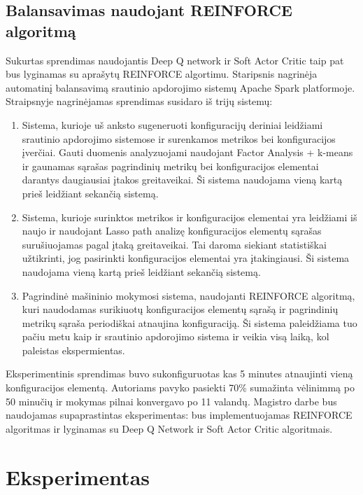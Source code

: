 \documentclass{VUMIFPSbakalaurinis}
\begin{document}
\subsection{Balansavimas naudojant REINFORCE algoritmą}
Sukurtas sprendimas naudojantis Deep Q network ir Soft Actor Critic taip pat bus lyginamas su \cite{vaquero2018autotuning} aprašytų REINFORCE algortimu. Staripsnis nagrinėja automatinį balansavimą srautinio apdorojimo sistemų Apache Spark platformoje. Straipsnyje nagrinėjamas sprendimas susidaro iš trijų sistemų:
\begin{enumerate}
    \item Sistema, kurioje uš anksto sugeneruoti konfiguracijų deriniai leidžiami srautinio apdorojimo sistemose ir surenkamos metrikos bei konfiguracijos įverčiai. Gauti duomenis analyzuojami naudojant Factor Analysis + k-means ir gaunamas sąrašas pagrindinių metrikų bei konfiguracijos elementai darantys daugiausiai įtakos greitaveikai. Ši sistema naudojama vieną kartą prieš leidžiant sekančią sistemą. 
    \item Sistema, kurioje surinktos metrikos ir konfiguracijos elementai yra leidžiami iš naujo ir naudojant Lasso path analizę konfiguracijos elementų sąrašas surušiuojamas pagal įtaką greitaveikai. Tai daroma siekiant statistiškai užtikrinti, jog pasirinkti konfiguracijos elementai yra įtakingiausi. Ši sistema naudojama vieną kartą prieš leidžiant sekančią sistemą.
    \item Pagrindinė mašininio mokymosi sistema, naudojanti REINFORCE algoritmą, kuri naudodamas surikiuotų konfiguracijos elementų sąrašą ir pagrindinių metrikų sąraša periodiškai atnaujina konfiguraciją. Ši sistema paleidžiama tuo pačiu metu kaip ir srautinio apdorojimo sistema ir veikia visą laiką, kol paleistas ekspermientas.
\end{enumerate}  
Eksperimentinis sprendimas buvo sukonfiguruotas kas 5 minutes atnaujinti vieną konfiguracijos elementą. Autoriams pavyko pasiekti 70\% sumažinta vėlinimmą po 50 minučių ir mokymas pilnai konvergavo po 11 valandų. Magistro darbe bus naudojamas supaprastintas eksperimentas: bus implementuojamas REINFORCE algoritmas ir lyginamas su Deep Q Network ir Soft Actor Critic algoritmais.

\section{Eksperimentas}


\printbibliography[heading=bibintoc] 
\end{document}
